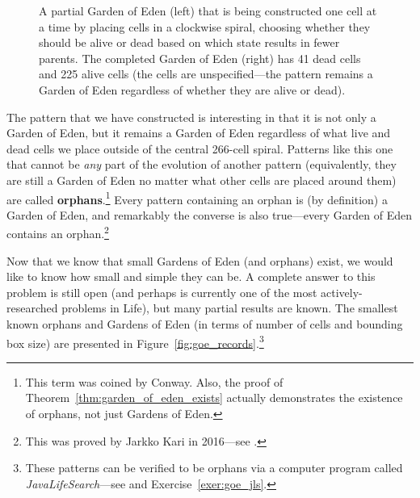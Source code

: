 \begin{figure}[!htb]
	\centering{}
	
	\caption{A partial Garden of Eden (left) that is being constructed one cell at a time by placing cells in a clockwise spiral, choosing whether they should be alive or dead based on which state results in fewer parents. The completed Garden of Eden (right) has 41 dead cells and 225 alive cells (the  cells are unspecified---the pattern remains a Garden of Eden regardless of whether they are alive or dead).}\label{fig:goe_1}
\end{figure}

The pattern that we have constructed is interesting in that it is not only a Garden of Eden, but it remains a Garden of Eden regardless of what live and dead cells we place outside of the central 266-cell spiral. Patterns like this one that cannot be \emph{any} part of the evolution of another pattern (equivalently, they are still a Garden of Eden no matter what other cells are placed around them) are called \textbf{orphans}.\footnote{This term was coined by Conway. Also, the proof of Theorem~\ref{thm:garden_of_eden_exists} actually demonstrates the existence of orphans, not just Gardens of Eden.} Every pattern containing an orphan is (by definition) a Garden of Eden, and remarkably the converse is also true---every Garden of Eden contains an orphan.\footnote{This was proved by Jarkko Kari in 2016---see .}

Now that we know that small Gardens of Eden (and orphans) exist, we would like to know how small and simple they can be. A complete answer to this problem is still open (and perhaps is currently one of the most actively-researched problems in Life), but many partial results are known. The smallest known orphans and Gardens of Eden (in terms of number of cells and bounding box size) are presented in Figure~\ref{fig:goe_records}.\footnote{These patterns can be verified to be orphans via a computer program called \emph{JavaLifeSearch}---see  and Exercise~\ref{exer:goe_jls}.}

